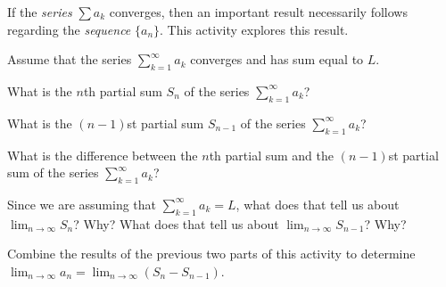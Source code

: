 \begin{activity} \label{8.3.Act2} If the \emph{series} $\sum a_k$ converges, then an important result necessarily follows regarding the \emph{sequence} $\{a_n\}$. This activity explores this result. 

Assume that the series $ \sum_{k=1}^{\infty} a_k$ 
converges and has sum equal to $L$. 

\ba
\item What is the $n$th partial sum $S_n$ of the series $ \sum_{k=1}^{\infty} a_k$?

\item What is the $(n-1)$st partial sum $S_{n-1}$ of the series $ \sum_{k=1}^{\infty} a_k$?

\item What is the difference between the $n$th partial sum and the $(n-1)$st partial sum of the series $ \sum_{k=1}^{\infty} a_k$?

\item Since we are assuming that  $ \sum_{k=1}^{\infty} a_k = L$, what does that tell us about $ \lim_{n \to \infty} S_n$? Why?  What does that tell us about $ \lim_{n \to \infty} S_{n-1}$? Why?



\item Combine the results of the previous two parts of this activity to determine $ \lim_{n \to \infty} a_n = \lim_{n \to \infty} (S_n - S_{n-1})$.


\ea

\end{activity}


